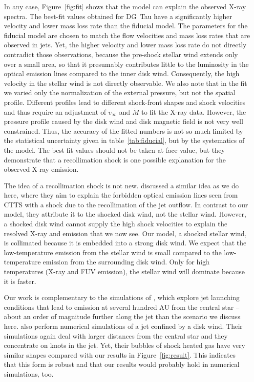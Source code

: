 \documentclass{emulateapj}
\begin{document}
In any case, Figure~\ref{fig:fit} shows that the model can explain the observed X-ray spectra. The best-fit values obtained for DG~Tau have a significantly higher velocity and lower mass loss rate than the fiducial model. The parameters for the fiducial model are chosen to match the flow velocities and mass loss rates that are observed in jets. Yet, the higher velocity and lower mass loss rate do not directly contradict those observations, because the pre-shock stellar wind extends only over a small area, so that it presumably contributes little to the luminosity in the optical emission lines compared to the inner disk wind. Consequently, the high velocity in the stellar wind is not directly observable. We also note that in the fit we varied only the normalization of the external pressure, but not the spatial profile. Different profiles lead to different shock-front shapes and shock velocities and thus require an adjustment of $v_\infty$ and $\dot M$ to fit the X-ray data. However, the pressure profile caused by the disk wind and disk magnetic field is not very well constrained. Thus, the accuracy of the fitted numbers is not so much limited by the statistical uncertainty given in table~\ref{tab:fiducial}, but by the systematics of the model. The best-fit values should not be taken at face value, but they demonstrate that a recollimation shock is one possible explanation for the observed X-ray emission. 

The idea of a recollimation shock is not new.
\citet{1993ApJ...409..748G} discussed a similar idea as we do here, where they aim to explain the forbidden optical emission lines seen from CTTS with a shock due to the recollimation of the jet outflow. In contrast to our model, they attribute it to the shocked disk wind, not the stellar wind. However, a shocked disk wind cannot supply the high shock velocities to explain the resolved X-ray and  emission that we now see. Our model, a shocked stellar wind, is collimated because it is embedded into a strong disk wind. We expect that the low-temperature emission from the stellar wind is small compared to the low-temperature emission from the surrounding disk wind. Only for high temperatures (X-ray and FUV emission), the stellar wind will dominate because it is faster.

Our work is complementary to the simulations of \citet{2010A&A...517A..68B,2010A&A...511A..42B,2011ApJ...737...54B}, which explore jet launching conditions that lead to emission at several hundred AU from the central star -- about an order of magnitude further along the jet than the scenario we discuss here. \citet{2009A&A...502..217M,2012A&A...545A..53M} also perform numerical simulations of a jet confined by a disk wind. Their simulations again deal with larger distances from the central star and they concentrate on knots in the jet. Yet, their bubbles of shock heated gas have very similar shapes compared with our results in Figure~\ref{fig:result}. This indicates that this form is robust and that our results would probably hold in numerical simulations, too. 
\end{document}

